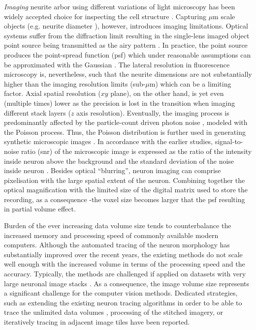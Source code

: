 \textit{Imaging} neurite arbor using different variations of light microscopy has been widely accepted choice for inspecting the cell structure \cite{meijering2010neuron, donohue2011automated}. Capturing $\mu$m scale objects (e.g. neurite diameter \cite{ascolitrees}), however, introduces imaging limitations. Optical systems suffer from the diffraction limit resulting in the single-lens imaged object point source being transmitted as the airy pattern \cite{cox2012optical}. In practice, the point source produces the point-spread function (\gls{psf}) which under reasonable assumptions can be approximated with the Gaussian \cite{zhang2007gaussian}. The lateral resolution in fluorescence microscopy is, nevertheless, such that the neurite dimensions are not substantially higher than the imaging resolution limits (sub-$\mu$m) which can be a limiting factor. Axial spatial resolution ($xy$ plane), on the other hand, is yet even (multiple times) lower as the precision is lost in the transition when imaging different stack layers ($z$ axis resolution). Eventually, the imaging process is predominantly affected by the particle-count driven photon noise \cite{van1998digital}, modeled with the Poisson process. Thus, the Poisson distribution is further used in generating synthetic microscopic images \cite{smal2010quantitative}. In accordance with the earlier studies, signal-to-noise ratio (\gls{snr}) of the microscopic image is expressed as the ratio of the intensity inside neuron above the background and the standard deviation of the noise inside neuron \cite{cheezum2001quantitative, smal2010quantitative}. Besides optical ``blurring'', neuron imaging can comprise pixelisation with the large spatial extent of the neuron. Combining together the optical magnification with the limited size of the digital matrix used to store the recording, as a consequence -the voxel size becomes larger that the \gls{psf} resulting in partial volume effect.%

Burden of the ever increasing data volume size tends to counterbalance the increased memory and processing speed of commonly available modern computers. Although the automated tracing of the neuron morphology has substantially improved over the recent years, the existing methods do not scale well enough with the increased volume in terms of the processing speed and the accuracy. Typically, the methods are challenged if applied on datasets with very large neuronal image stacks \cite{peng2017automatic}. As a consequence, the image volume size represents a significant challenge for the computer vision methods. Dedicated strategies, such as extending the existing neuron tracing algorithms in order to be able to trace the unlimited data volumes \cite{peng2017automatic}, processing of the stitched imagery, or iteratively tracing in adjacent image tiles \cite{zhou2015neuron} have been reported.

